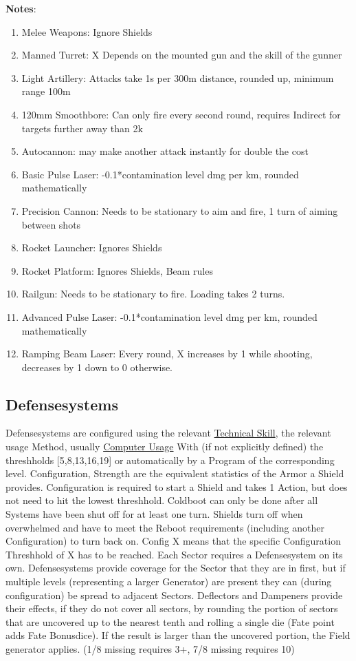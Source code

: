 \textbf{Notes}:
\begin{enumerate}[label = - ]
\item Melee Weapons: Ignore Shields
\item Manned Turret: X Depends on the mounted gun and the skill of the gunner
\item Light Artillery: Attacks take 1s per 300m distance, rounded up, minimum range 100m
\item 120mm Smoothbore: Can only fire every second round, requires Indirect for targets further away than 2k
\item Autocannon: may make another attack instantly for double the cost
\item Basic Pulse Laser: -0.1*contamination level dmg per km, rounded mathematically
\item Precision Cannon: Needs to be stationary to aim and fire, 1 turn of aiming between shots
\item Rocket Launcher: Ignores Shields
\item Rocket Platform: Ignores Shields, Beam rules
\item Railgun: Needs to be stationary to fire.
Loading takes 2 turns.
\item Advanced Pulse Laser: -0.1*contamination level dmg per km, rounded mathematically
\item Ramping Beam Laser: Every round, X increases by 1 while shooting, decreases by 1 down to 0 otherwise.
\end{enumerate}


\subsection{Defensesystems}\label{subsec:defensesystems}
Defensesystems are configured using the relevant \hyperref[subsubsec:defense]{Technical Skill},
the relevant usage Method, usually \hyperref[subsec:computer]{Computer Usage}
With (if not explicitly defined) the threshholds [5,8,13,16,19] or automatically by a Program of the corresponding level.
Configuration, Strength are the equivalent statistics of the Armor a Shield provides.
Configuration is required to start a Shield and takes 1 Action, but does not need to hit the lowest threshhold.
Coldboot can only be done after all Systems have been shut off for at least one turn.
Shields turn off when overwhelmed and have to meet the Reboot requirements (including another Configuration) to turn
back on.
Config X means that the specific Configuration Threshhold of X has to be reached.
Each Sector requires a Defensesystem on its own.
Defensesystems provide coverage for the Sector that they are in first, but if multiple levels (representing a larger
Generator) are present they can (during configuration) be spread to adjacent Sectors.
Deflectors and Dampeners provide their effects, if they do not cover all sectors, by rounding the portion of sectors
that are uncovered up to the nearest tenth and rolling a single die (Fate point adds Fate Bonusdice).
If the result is larger than the uncovered portion, the Field generator applies.
(1/8 missing requires 3+, 7/8 missing requires 10)

